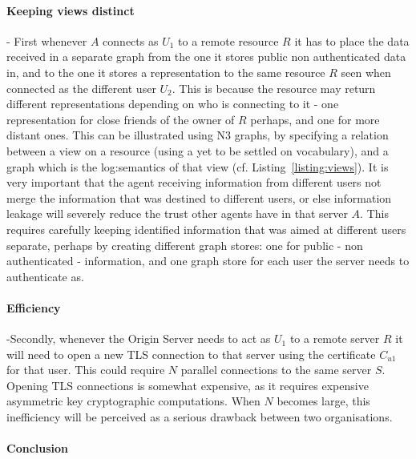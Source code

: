 \documentclass[a4paper]{llncs}
\begin{document}
\paragraph{Keeping views distinct}-
First whenever $A$ connects as $U_1$ to a remote resource $R$ it has to place the data received in a separate graph from the one it stores public non authenticated data in, and to the one it stores a representation to the same resource $R$ seen when connected as the different user $U_2$. 
This is because the resource may return different representations depending on who is connecting to it - one representation for close friends of the owner of $R$ perhaps, and one for more distant ones. 
This can be illustrated using N3 graphs, by specifying a relation between a view on a resource (using a yet to be settled on vocabulary), and a graph which is the log:semantics of that view (cf. Listing~\ref{listing:views}). 
It is very important that the agent receiving information from different users not merge the information that was destined to different users, or else information leakage will severely reduce the trust other agents have in that server $A$. 
This requires carefully keeping identified information that was aimed at different users separate, perhaps by creating different graph stores: one for public - non authenticated - information, and one graph store for each user the server needs to authenticate as.



\paragraph{Efficiency}-Secondly, whenever the Origin Server needs to act as $U_1$ to a remote server $R$ it will need to open a new TLS connection to that server using the certificate $C_{u1}$ for that user.
This could require $N$ parallel connections to the same server $S$. 
Opening TLS connections is somewhat expensive, as it requires expensive asymmetric key cryptographic computations. 
When $N$ becomes large, this inefficiency will be perceived as a serious drawback between two organisations.
 
\paragraph{Conclusion}
\end{document}
